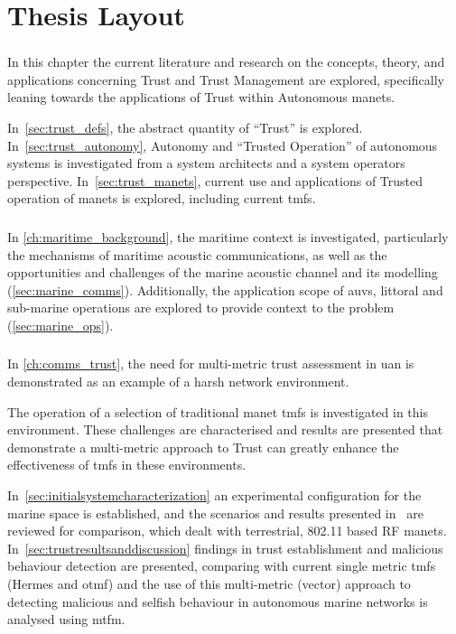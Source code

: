 \section{Thesis Layout}

\subsubsection{}
In this chapter the current literature and research on the concepts, theory, and applications concerning Trust and Trust Management are explored, specifically leaning towards the applications of Trust within Autonomous \glspl{manet}.

In~\autoref{sec:trust_defs}, the abstract quantity of ``Trust'' is explored.
In~\autoref{sec:trust_autonomy}, Autonomy and ``Trusted Operation'' of autonomous systems is investigated from a system architects and a system operators perspective.
In~\autoref{sec:trust_manets}, current use and applications of Trusted operation of \glspl{manet} is explored, including current \glspl{tmf}.

\subsubsection{}
In \autoref{ch:maritime_background}, the maritime context is investigated, particularly the mechanisms of maritime acoustic communications, as well as the opportunities and challenges of the marine acoustic channel and its modelling (\autoref{sec:marine_comms}).
Additionally, the application scope of \glspl{auv}, littoral and sub-marine operations are explored to provide context to the problem (\autoref{sec:marine_ops}).

\subsubsection{}
In \autoref{ch:comms_trust}, the need for multi-metric trust assessment in \gls{uan} is demonstrated as an example of a harsh network environment.

The operation of a selection of traditional \gls{manet} \glspl{tmf} is investigated in this environment.
These challenges are characterised and results are presented that demonstrate a multi-metric approach to Trust can greatly enhance the effectiveness of \glspl{tmf} in these environments.

In~\autoref{sec:initialsystemcharacterization} an experimental configuration for the marine space is established, and the scenarios and results presented in~\citet{Guo11} are reviewed for comparison, which dealt with terrestrial, 802.11 based RF \glspl{manet}.
In~\autoref{sec:trustresultsanddiscussion} findings in trust establishment and malicious behaviour detection are presented, comparing with current single metric \glspl{tmf} (Hermes and \gls{otmf}) and the use of this multi-metric (vector) approach to detecting malicious and selfish behaviour in autonomous marine networks is analysed using \gls{mtfm}.

